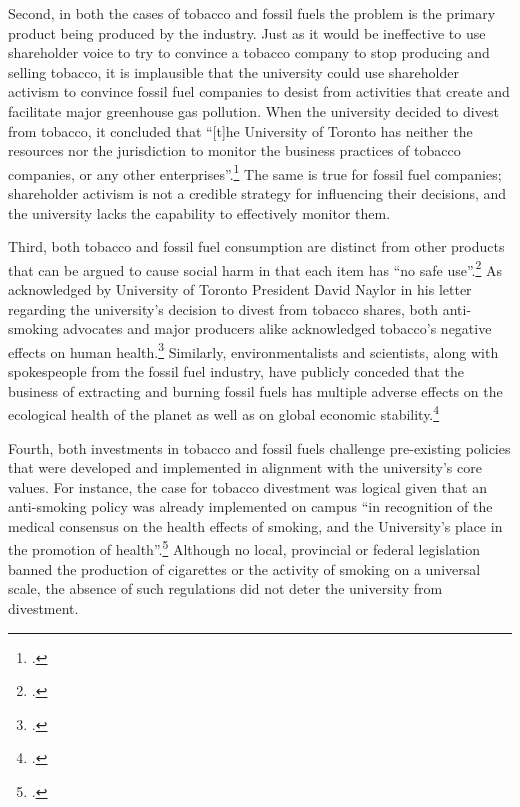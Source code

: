 Second, in both the cases of tobacco and fossil fuels the problem is the primary product being produced by the industry.
Just as it would be ineffective to use shareholder voice to try to convince a tobacco company to stop producing and selling tobacco, it is implausible that the university could use shareholder activism to convince fossil fuel companies to desist from activities that create and facilitate major greenhouse gas pollution.
When the university decided to divest from tobacco, it concluded that ``[t]he University of Toronto has neither the resources nor the jurisdiction to monitor the business practices of tobacco companies, or any other enterprises''.\footcite[][p. 7]{TobaccoReport_2007}
The same is true for fossil fuel companies; shareholder activism is not a credible strategy for influencing their decisions, and the university lacks the capability to effectively monitor them.



Third, both tobacco and fossil fuel consumption are distinct from other products that can be argued to cause social harm in that each item has ``no safe use''.\footcite[See: ][p. 9]{TobaccoReport_2007}
As acknowledged by University of Toronto President David Naylor in his letter regarding the university's decision to divest from tobacco shares, both anti-smoking advocates and major producers alike acknowledged tobacco's negative effects on human health.\footcite[][]{TStarSellOff}  
Similarly, environmentalists and scientists, along with spokespeople from the fossil fuel industry, have publicly conceded that the business of extracting and burning fossil fuels has multiple adverse effects on the ecological health of the planet as well as on global economic stability.\footcite[See, for example: ][p. 3--18]{OilIndustryVanDenHove}



Fourth, both investments in tobacco and fossil fuels challenge pre-existing policies that were developed and implemented in alignment with the university's core values. 
For instance, the case for tobacco divestment was logical given that an anti-smoking policy was already implemented on campus ``in recognition of the medical consensus on the health effects of smoking, and the University's place in the promotion of health''.\footcite[See: ][p. 9]{TobaccoReport_2007}
Although no local, provincial or federal legislation banned the production of cigarettes or the activity of smoking on a universal scale, the absence of such regulations did not deter the university from divestment. 



